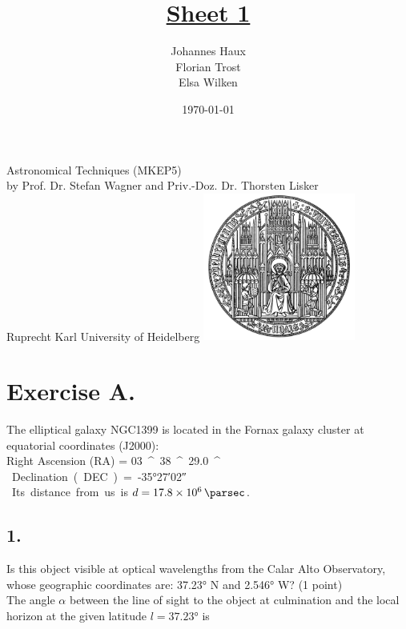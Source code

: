 \documentclass[11pt,a4paper,twoside]{article}
\title{\LARGE \underline {Sheet 1}}
\author{Johannes Haux \\ Florian Trost \\ Elsa Wilken}
\date{\today}
\begin{document}
\maketitle
\thispagestyle{empty}

\begin{center}
  Astronomical Techniques (MKEP5) \\
  \baselineskip35pt
  by Prof. Dr. Stefan Wagner and Priv.-Doz. Dr. Thorsten Lisker \\
  \baselineskip60pt
  Ruprecht Karl University of Heidelberg
\vskip 40pt
\includegraphics[width=5cm]{pic/UniHD.png}

\end{center}

\newpage
\setcounter{page}{1}		%

\section*{Exercise A.} 

The elliptical galaxy NGC1399 is located in the Fornax galaxy cluster at equatorial coordinates (J2000): \\

Right Ascension (RA) =  \SI{03}{^\hour} \SI{38}{^\minute} \SI{29.0}{^\second} \\
Declination (DEC) = \ang{-35;27;02} \\

Its distance from us is $d = \SI{17.8e6}{\parsec}$. \\

\subsection*{1.} Is this object visible at optical wavelengths from the Calar Alto Observatory, whose geographic coordinates are: \ang{37.23} N and \ang{2.546} W? (1 point) \\

The angle $\alpha$ between the line of sight to the object at culmination and the local horizon at the given latitude $l = \ang{37.23}$ is 
\end{document}
